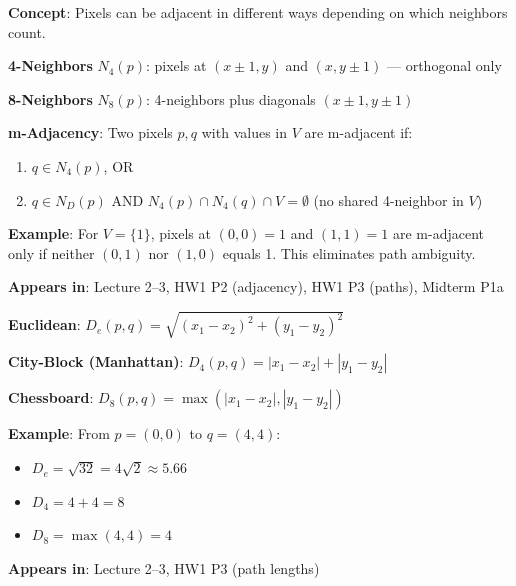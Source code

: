 \documentclass[10pt]{article}
\begin{document}
\begin{conceptbox}

\textbf{Concept}: Pixels can be adjacent in different ways depending on which neighbors count.

\begin{formulabox}
\textbf{4-Neighbors} $N_4(p)$: pixels at $(x\pm 1, y)$ and $(x, y\pm 1)$ --- orthogonal only

\textbf{8-Neighbors} $N_8(p)$: 4-neighbors plus diagonals $(x\pm 1, y\pm 1)$

\textbf{m-Adjacency}: Two pixels $p, q$ with values in $V$ are m-adjacent if:
\begin{enumerate}[leftmargin=1.5em, itemsep=0pt, topsep=2pt]
    \item $q \in N_4(p)$, OR
    \item $q \in N_D(p)$ AND $N_4(p) \cap N_4(q) \cap V = \emptyset$ (no shared 4-neighbor in $V$)
\end{enumerate}
\end{formulabox}

\begin{examplebox}
\textbf{Example}: For $V = \{1\}$, pixels at $(0,0)=1$ and $(1,1)=1$ are m-adjacent only if neither $(0,1)$ nor $(1,0)$ equals 1. This eliminates path ambiguity.
\end{examplebox}

\textbf{Appears in}: Lecture 2--3, HW1 P2 (adjacency), HW1 P3 (paths), Midterm P1a

\end{conceptbox}


\begin{conceptbox}

\begin{formulabox}
\textbf{Euclidean}: $D_e(p,q) = \sqrt{(x_1-x_2)^2 + (y_1-y_2)^2}$

\textbf{City-Block (Manhattan)}: $D_4(p,q) = |x_1-x_2| + |y_1-y_2|$

\textbf{Chessboard}: $D_8(p,q) = \max(|x_1-x_2|, |y_1-y_2|)$
\end{formulabox}

\begin{examplebox}
\textbf{Example}: From $p=(0,0)$ to $q=(4,4)$:
\begin{itemize}[leftmargin=1.5em, itemsep=0pt, topsep=2pt]
    \item $D_e = \sqrt{32} = 4\sqrt{2} \approx 5.66$
    \item $D_4 = 4 + 4 = 8$
    \item $D_8 = \max(4,4) = 4$
\end{itemize}
\end{examplebox}

\textbf{Appears in}: Lecture 2--3, HW1 P3 (path lengths)

\end{conceptbox}
\end{document}
